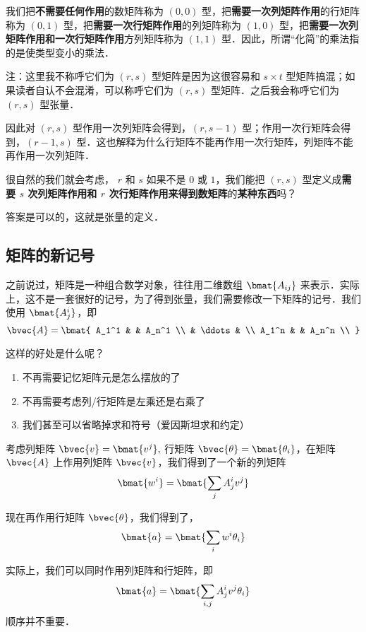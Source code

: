我们把\textbf{不需要任何作用}的数矩阵称为 $(0,0)$ 型，把\textbf{需要一次列矩阵作用}的行矩阵称为 $(0,1)$ 型，把\textbf{需要一次行矩阵作用}的列矩阵称为 $(1,0)$ 型，把\textbf{需要一次列矩阵作用和一次行矩阵作用}方列矩阵称为 $(1,1)$ 型．因此，所谓“化简”的乘法指的是使类型变小的乘法．

注：这里我不称呼它们为 $(r, s)$ 型矩阵是因为这很容易和 $s \times t$ 型矩阵搞混；如果读者自认不会混淆，可以称呼它们为 $(r, s)$ 型矩阵．之后我会称呼它们为$(r, s)$ 型张量．

因此对 $(r, s)$ 型作用一次列矩阵会得到，$(r, s - 1)$ 型；作用一次行矩阵会得到，$(r - 1, s)$ 型．这也解释为什么行矩阵不能再作用一次行矩阵，列矩阵不能再作用一次列矩阵．

很自然的我们就会考虑， $r$ 和 $s$ 如果不是 $0$ 或 $1$，我们能把 $(r, s)$ 型定义成\textbf{需要 $s$ 次列矩阵作用和 $r$ 次行矩阵作用来得到数矩阵}的\textbf{某种东西}吗？

答案是可以的，这就是张量的定义．

\subsection{矩阵的新记号}

之前说过，矩阵是一种组合数学对象，往往用二维数组 $\bmat{A_{i j}}$ 来表示．实际上，这不是一套很好的记号，为了得到张量，我们需要修改一下矩阵的记号．我们使用 $\bmat{A^i_j}$，即
$$
\bvec{A} = \bmat{
A_1^1 &  & A_n^1 \\
 & \ddots & \\
A_1^n &  & A_n^n \\
}
$$

这样的好处是什么呢？
\begin{enumerate}
\item 不再需要记忆矩阵元是怎么摆放的了
\item 不再需要考虑列/行矩阵是左乘还是右乘了
\item 我们甚至可以省略掉求和符号（爱因斯坦求和约定）
\end{enumerate}


考虑列矩阵 $\bvec{v} = \bmat{v^j},$ 行矩阵 $\bvec{\theta} = \bmat{\theta_i}$，在矩阵 $\bvec{A}$ 上作用列矩阵 $\bvec{v}$，我们得到了一个新的列矩阵
$$
\bmat{w^i} = \bmat{\sum_j A^i_j v^j}
$$

现在再作用行矩阵 $\bvec{\theta}$，我们得到了，
$$
\bmat{a} = \bmat{\sum_i w^i \theta_i}
$$

实际上，我们可以同时作用列矩阵和行矩阵，即
$$
\bmat{a} = \bmat{\sum_{i, j} A^i_j v^j \theta_i}
$$
顺序并不重要．

